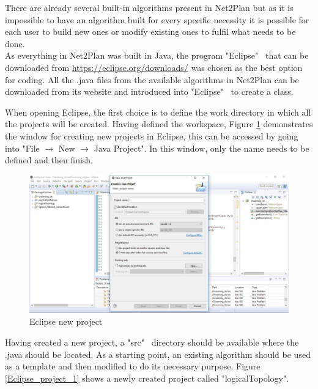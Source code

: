 	There are already several built-in algorithms present in Net2Plan but as it is impossible to have an algorithm built for every specific necessity it is possible for each user to build new ones or modify existing ones to fulfil what needs to be done.\\
	
	As everything in Net2Plan was built in Java, the program "Eclipse" \ that can be downloaded from \url{https://eclipse.org/downloads/} was chosen as the best option for coding. All the .java files from the available algorithms in Net2Plan can be downloaded from its website and introduced into "Eclipse" \ to create a class.
	
	When opening Eclipse, the first choice is to define the work directory in which all the projects will be created. Having defined the workspace, Figure \ref{Eclipse_project} demonstrates the window for creating new projects in Eclipse, this can be accessed by going into "File $\rightarrow$ New $\rightarrow$ Java Project". In this window, only the name needs to be defined and then finish.
	
	\vspace{1.5cm}
	\begin{figure}[h!]
		\centering
		\includegraphics[width = 13cm]{Eclipse_project.pdf}
		\caption{Eclipse new project}
		\label{Eclipse_project}
	\end{figure}	
	
	\newpage
	
	Having created a new project, a "src" \ directory should be available where the .java should be located. As a starting point, an existing algorithm should be used as a template and then modified to do its necessary purpose. Figure \ref{Eclipse_project_1} shows a newly created project called "logicalTopology".
	
